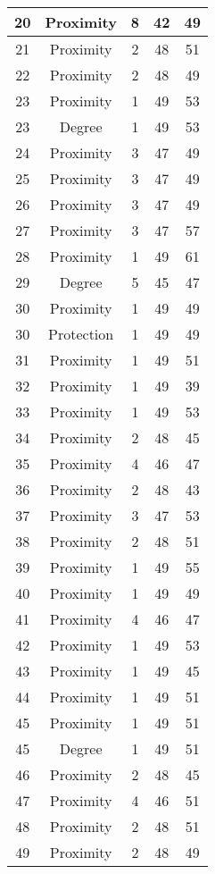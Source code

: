 \documentclass[results.tex]{subfiles}
\begin{document}
\begin{center}
\begin{tabular}{| c || c | c | c | c |}
    \hline
    20 & Proximity & 8 & 42 & 49 \\ 
    \hline
    21 & Proximity & 2 & 48 & 51 \\ 
    \hline
    22 & Proximity & 2 & 48 & 49 \\ 
    \hline
    23 & Proximity & 1 & 49 & 53 \\ 
    \hline
    23 & Degree & 1 & 49 & 53 \\ 
    \hline
    24 & Proximity & 3 & 47 & 49 \\ 
    \hline
    25 & Proximity & 3 & 47 & 49 \\ 
    \hline
    26 & Proximity & 3 & 47 & 49 \\ 
    \hline
    27 & Proximity & 3 & 47 & 57 \\ 
    \hline
    28 & Proximity & 1 & 49 & 61 \\ 
    \hline
    29 & Degree & 5 & 45 & 47 \\ 
    \hline
    30 & Proximity & 1 & 49 & 49 \\ 
    \hline
    30 & Protection & 1 & 49 & 49 \\ 
    \hline
    31 & Proximity & 1 & 49 & 51 \\ 
    \hline
    32 & Proximity & 1 & 49 & 39 \\ 
    \hline
    33 & Proximity & 1 & 49 & 53 \\ 
    \hline
    34 & Proximity & 2 & 48 & 45 \\ 
    \hline
    35 & Proximity & 4 & 46 & 47 \\ 
    \hline
    36 & Proximity & 2 & 48 & 43 \\ 
    \hline
    37 & Proximity & 3 & 47 & 53 \\ 
    \hline
    38 & Proximity & 2 & 48 & 51 \\ 
    \hline
    39 & Proximity & 1 & 49 & 55 \\ 
    \hline
    40 & Proximity & 1 & 49 & 49 \\ 
    \hline
    41 & Proximity & 4 & 46 & 47 \\ 
    \hline
    42 & Proximity & 1 & 49 & 53 \\ 
    \hline
    43 & Proximity & 1 & 49 & 45 \\ 
    \hline
    44 & Proximity & 1 & 49 & 51 \\ 
    \hline
    45 & Proximity & 1 & 49 & 51 \\ 
    \hline
    45 & Degree & 1 & 49 & 51 \\ 
    \hline
    46 & Proximity & 2 & 48 & 45 \\ 
    \hline
    47 & Proximity & 4 & 46 & 51 \\ 
    \hline
    48 & Proximity & 2 & 48 & 51 \\ 
    \hline
    49 & Proximity & 2 & 48 & 49 \\ 
    \hline   \end{tabular}
\end{center}
\end{document}
